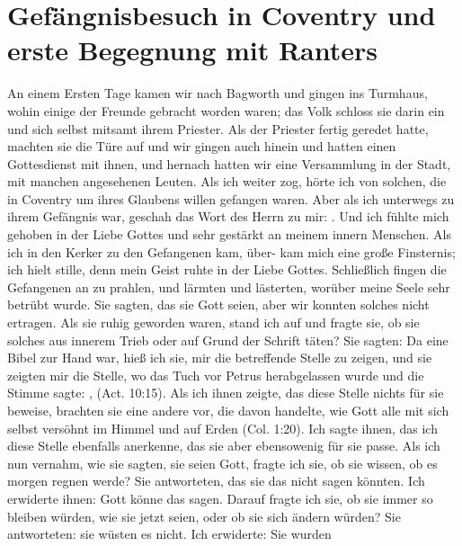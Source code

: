 \section{Gefängnisbesuch in Coventry und erste Begegnung mit Ranters}

An einem Ersten Tage kamen wir nach Bagworth\ort{} und gingen
ins Turmhaus, wohin einige der Freunde gebracht worden waren;
das Volk schloss sie darin ein und sich selbst mitsamt ihrem
Priester. Als der Priester fertig geredet hatte, machten sie die
Türe auf und wir gingen auch hinein und hatten einen 
Gottesdienst mit ihnen, und hernach hatten wir eine Versammlung in
der Stadt, mit manchen angesehenen Leuten. Als ich weiter zog,
hörte ich von solchen, die in Coventry um ihres Glaubens willen
gefangen waren. Aber als ich unterwegs zu ihrem Gefängnis war,
geschah das Wort des Herrn zu mir: . Und ich fühlte mich 
gehoben in der Liebe Gottes und sehr gestärkt an meinem innern
Menschen. Als ich in den Kerker zu den Gefangenen kam, über-
kam mich eine große Finsternis; ich hielt stille, denn mein Geist
ruhte in der Liebe Gottes. Schließlich fingen die Gefangenen
an zu prahlen, und lärmten und lästerten, worüber meine
Seele sehr betrübt wurde. Sie sagten, das sie Gott seien, aber
wir konnten solches nicht ertragen. Als sie ruhig geworden
waren, stand ich auf und fragte sie, ob sie solches aus innerem
Trieb oder auf Grund der Schrift täten? Sie sagten:  Da eine Bibel zur Hand war, hieß ich sie,
mir die betreffende Stelle zu zeigen, und sie zeigten mir die Stelle,
wo das Tuch vor Petrus herabgelassen wurde und die Stimme
sagte: ,
(Act. 10:15). Als ich ihnen zeigte, das diese Stelle nichts für
sie beweise, brachten sie eine andere vor, die davon handelte, wie
Gott alle mit sich selbst versöhnt im Himmel und auf Erden
(Col. 1:20). Ich sagte ihnen, 
das ich diese Stelle ebenfalls anerkenne, das sie aber 
ebensowenig für sie passe. Als ich nun
vernahm, wie sie sagten, sie seien Gott, fragte ich sie, ob sie
wissen, ob es morgen regnen werde? Sie antworteten, das sie
das nicht sagen könnten. Ich erwiderte ihnen: Gott könne das
sagen. Darauf fragte ich sie, ob sie immer so bleiben würden,
wie sie jetzt seien, oder ob sie sich ändern würden? Sie 
antworteten: sie wüsten es nicht. Ich erwiderte:  Sie wurden 
